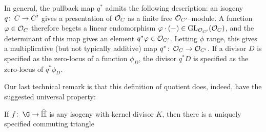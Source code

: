 \begin{remark}
In general, the pullback map \(q^*\) admits the following description: an isogeny \(q\colon\thinspace C \to C'\) gives a presentation of \(\mathcal{O}_C\) as a finite free \(\mathcal{O}_{C'}\)--module.  A function \(\varphi \in \mathcal{O}_C\) therefore begets a linear endomorphism \(\varphi \cdot (-) \in \operatorname{GL}_{\mathcal{O}_{C'}}(\mathcal{O}_C)\), and the determinant of this map gives an element \(q^* \varphi \in \mathcal{O}_{C'}\).  Letting \(\phi\) range, this gives a multiplicative (but not typically additive) map \(q^*\colon\thinspace \mathcal{O}_C \to \mathcal{O}_{C'}\).  If a divisor \(D\) is specified as the zero-locus of a function \(\phi_D\), the divisor \(q^* D\) is specified as the zero-locus of \(q^* \phi_D\).
\end{remark}

Our last technical remark is that this definition of quotient does, indeed, have the suggested universal property:

\begin{lemma}
If \(f\co \G \to \widehat{\mathbb H}\) is any isogeny with kernel divisor \(K\), then there is a uniquely specified commuting triangle
\begin{center}
\end{center}
\end{lemma}

